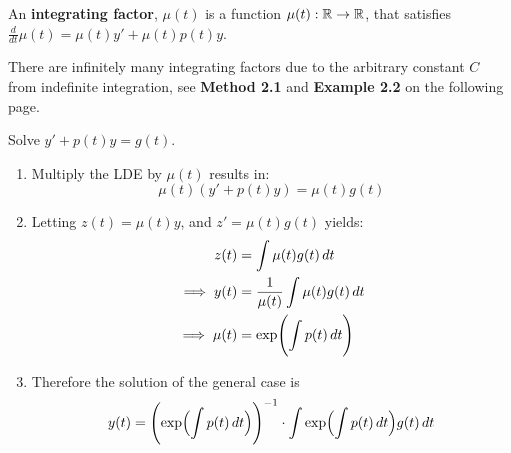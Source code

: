 \documentclass[diffeq.tex]{subfiles}
\begin{document}
    \begin{definition}
        An \textbf{integrating factor}, $\mu(t)$ is a function $\mu(t): \mathbb{R} \to \mathbb{R}$, that satisfies $\frac{d}{dt}\mu(t) = \mu(t)y'+\mu(t)p(t)y$.
    \end{definition}
    \begin{remark}
        There are infinitely many integrating factors due to the arbitrary constant $C$ from indefinite integration, see \textbf{Method 2.1} and \textbf{Example 2.2} on the following page.
    \end{remark}
    \np
    \begin{method}
        Solve $y' + p(t)y = g(t)$.
        \begin{enumerate}
            \item Multiply the LDE by $\mu(t)$ results in:
                \begin{equation}
                    \mu(t)(y' + p(t)y) = \mu(t)g(t)
                \end{equation}
            \item Letting $z(t) = \mu(t)y$, and $z' = \mu(t)g(t)$ yields:
                \begin{align}
                    z(t) &= \int \mu(t)g(t)\,dt\\
                    \implies y(t) &= \frac{1}{\mu(t)}\int \mu(t)g(t)\,dt\\
                    \implies \mu(t) &= \exp\BBp{\int p(t)\,dt}
                \end{align}
            \item Therefore the solution of the general case is
                \begin{equation}
                    y(t) = \BBp{\exp\Bp{\int p(t)\,dt}}^{-1}\cdot \int \exp\Bp{\int p(t)\,dt}g(t)\,dt
                \end{equation}
        \end{enumerate}
    \end{method}
\end{document}
